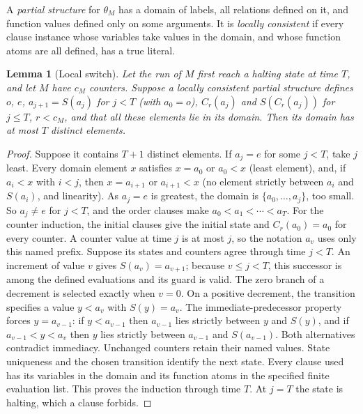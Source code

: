 \documentclass[11pt,a4paper,oneside,openany]{book}
\newtheorem{lemma}[theorem]{Lemma}
\theoremstyle{definition}\newtheorem{definition}[theorem]{Definition}
\theoremstyle{remark}\newtheorem{remark}[theorem]{Remark}
\numberwithin{equation}{chapter}
\begin{document}
A \emph{partial structure} for $\theta_M$ has a domain of labels, all relations defined on it, and
function values defined only on some arguments. It is \emph{locally consistent} if every clause
instance whose variables take values in the domain, and whose function atoms are all defined,
has a true literal.

\begin{lemma}[Local switch]\label{tx:lem:local-switch}
Let the run of $M$ first reach a halting state at time $T$, and let $M$ have $c_M$ counters.
Suppose a locally consistent partial structure defines $o$, $e$, $a_{j+1}=S(a_j)$ for $j<T$
\textup{(}with $a_0=o$\textup{)}, $C_r(a_j)$ and $S(C_r(a_j))$ for $j\le T$, $r<c_M$, and that all these
elements lie in its domain. Then its domain has at most $T$ distinct elements.
\end{lemma}
\begin{proof}
Suppose it contains $T+1$ distinct elements. If $a_j=e$ for some $j<T$, take $j$ least. Every
domain element $x$ satisfies $x=a_0$ or $a_0<x$ (least element), and, if $a_i<x$ with $i<j$, then
$x=a_{i+1}$ or $a_{i+1}<x$ (no element strictly between $a_i$ and $S(a_i)$, and linearity). As
$a_j=e$ is greatest, the domain is $\{a_0,\ldots,a_j\}$, too small. So $a_j\ne e$ for $j<T$, and
the order clauses make $a_0<a_1<\cdots<a_T$. For the counter induction, the initial clauses give the initial
state and $C_r(a_0)=a_0$ for every counter. A counter value at time $j$
is at most $j$, so the notation $a_v$ uses only this named prefix.
Suppose its states and counters agree through time $j<T$.
An increment of value $v$ gives $S(a_v)=a_{v+1}$; because $v\le j<T$,
this successor is among the defined evaluations and its guard is valid.
The zero branch of a decrement is selected exactly when $v=0$.
On a positive decrement, the transition specifies a value $y<a_v$
with $S(y)=a_v$. The immediate-predecessor property forces
$y=a_{v-1}$: if $y<a_{v-1}$ then $a_{v-1}$ lies strictly between
$y$ and $S(y)$, and if $a_{v-1}<y<a_v$ then $y$ lies strictly
between $a_{v-1}$ and $S(a_{v-1})$. Both alternatives contradict
immediacy. Unchanged counters retain their named values. State
uniqueness and the chosen transition identify the next state.
Every clause used has its variables in the domain and its function
atoms in the specified finite evaluation list. This proves the
induction through time $T$. At $j=T$ the state is halting, which a clause forbids.
\end{proof}
\end{document}
